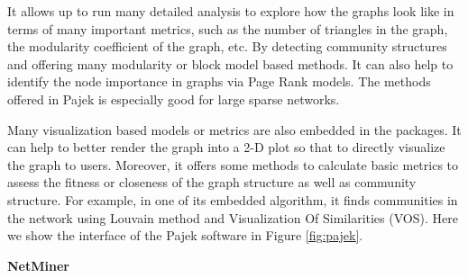 It allows up to run many  detailed analysis to explore how the graphs look like in terms of many important metrics, such as the number of triangles in the graph, the modularity coefficient of the graph, etc. By detecting community structures  and offering many modularity or block model based methods. It can also help to identify the node importance in graphs via Page Rank models. The methods offered in Pajek is especially good for large sparse networks.

Many visualization based models or metrics are also embedded in the packages. It can help to better render the graph into a 2-D plot so that to directly visualize the graph to users.  Moreover, it offers some methods to calculate  basic metrics to assess the fitness or closeness of the graph structure as well as  community structure. For example, in one of its embedded algorithm, it finds communities in the network using Louvain method and Visualization Of Similarities (VOS). Here we show the interface of the Pajek software in Figure \ref{fig:pajek}.

\textbf{NetMiner}

